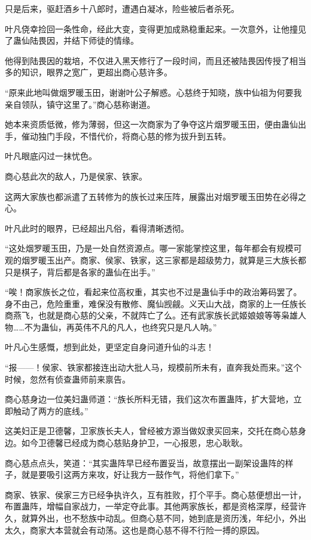 \begin{this_body}
只是后来，驱赶酒乡十八郎时，遭遇白凝冰，险些被后者杀死。

叶凡侥幸捡回一条性命，经此大变，变得更加成熟稳重起来。一次意外，让他撞见了蛊仙陆畏因，并结下师徒的情缘。

他得到陆畏因的栽培，不仅进入黑天修行了一段时间，而且还被陆畏因传授了相当多的知识，眼界之宽广，更超出商心慈许多。

“原来此地叫做烟罗暖玉田，谢谢叶公子解惑。心慈终于知晓，族中仙祖为何要我亲自领队，镇守这里了。”商心慈称谢道。

她本来资质低微，修为薄弱，但这一次商家为了争夺这片烟罗暖玉田，便由蛊仙出手，催动独门手段，不惜代价，将商心慈的修为拔升到五转。

叶凡眼底闪过一抹忧色。

商心慈此次的敌人，乃是侯家、铁家。

这两大家族也都派遣了五转修为的族长过来压阵，展露出对烟罗暖玉田势在必得之心。

叶凡此时的眼界，已经超出凡俗，看得清晰透彻。

“这处烟罗暖玉田，乃是一处自然资源点。哪一家能掌控这里，每年都会有规模可观的烟罗暖玉出产。商家、侯家、铁家，这三家都是超级势力，就算是三大族长都只是棋子，背后都是各家的蛊仙在出手。”

“唉！商家族长之位，看起来位高权重，其实也不过是蛊仙手中的政治筹码罢了。身不由己，危险重重，难保没有散修、魔仙觊觎。义天山大战，商家的上一任族长商燕飞，也就是商心慈的父亲，不就阵亡了么。还有武家族长武姬娘娘等等枭雄人物……不为蛊仙，再英伟不凡的凡人，也终究只是凡人呐。”

叶凡心生感慨，想到此处，更坚定自身问道升仙的斗志！

“报——！侯家、铁家都接连出动大批人马，规模前所未有，直奔我处而来。”这个时候，忽然有侦查蛊师前来禀告。

商心慈身边一位美妇蛊师道：“族长所料无错，我们这次布置蛊阵，扩大营地，立即触动了两方的底线。”

这美妇正是卫德馨，卫家族长夫人，曾经被方源当做奴隶买回来，交托在商心慈身边。如今卫德馨已经成为商心慈贴身护卫，一心报恩，忠心耿耿。

商心慈点点头，笑道：“其实蛊阵早已经布置妥当，故意摆出一副架设蛊阵的样子，就是要吸引这两方来攻，好让我方一鼓作气，将他们拿下。”

商家、铁家、侯家三方已经争执许久，互有胜败，打个平手。商心慈便想出一计，布置蛊阵，增幅自家战力，一举定夺此事。其他两家族长，都是资格深厚，经营许久，就算外出，也不愁族中动乱。但商心慈不同，她到底是资历浅，年纪小，外出太久，商家大本营就会有动荡。这也是商心慈不得不行险一搏的原因。


\end{this_body}
